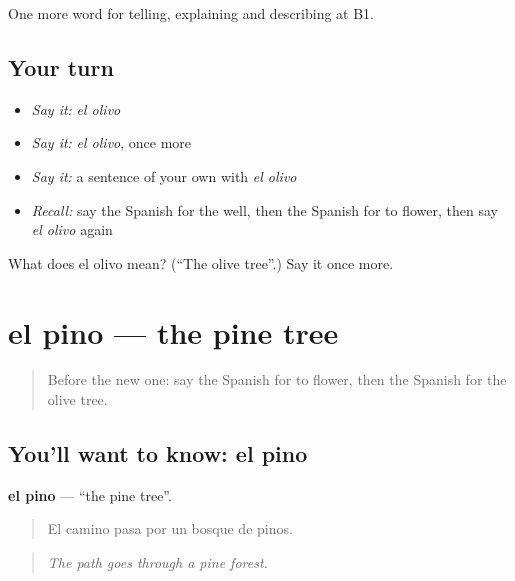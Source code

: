\begin{grammarlens}[title={What you've built}]
One more word for telling, explaining and describing at B1.
\end{grammarlens}

\subsection*{Your turn}
\begin{itemize}
\raggedright
  \item \emph{Say it:} \emph{el olivo}
  \item \emph{Say it:} \emph{el olivo}, once more
  \item \emph{Say it:} a sentence of your own with \emph{el olivo}
  \item \emph{Recall:} say the Spanish for the well, then the Spanish for to flower, then say \emph{el olivo} again
\end{itemize}

\begin{tcolorbox}[breakable,colback=teal!4,colframe=teal!35!black,title={Before you move on}]
What does el olivo mean? (\textquotedblleft{}The olive tree\textquotedblright{}.) Say it once more.
\end{tcolorbox}
\section[el pino]{el pino — the pine tree}

\label{lesson:ES-C693-pino}



\begin{quote}
Before the new one: say the Spanish for to flower, then the Spanish for the olive tree.
\end{quote}

\subsection*{You'll want to know: el pino}
\textbf{el pino} — \textquotedblleft{}the pine tree\textquotedblright{}.

\begin{quote}
El camino pasa por un bosque de pinos.
\end{quote}

\begin{quote}
\emph{The path goes through a pine forest.}
\end{quote}

